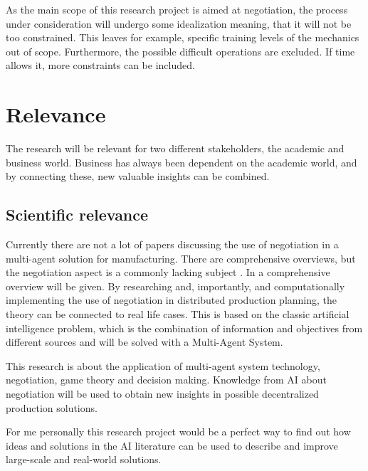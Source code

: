 As the main scope of this research project is aimed at negotiation, the process under consideration will undergo some idealization meaning, that it will not be too constrained. This leaves for example, specific training levels of the mechanics out of scope. Furthermore, the possible difficult operations are excluded.  If time allows it, more constraints can be included.

%

\section{Relevance}%
The research will be relevant for two different stakeholders, the academic and business world. Business has always been dependent on the academic world, and by connecting these, new valuable insights can be combined.
\subsection{Scientific relevance}
Currently there are not a lot of papers discussing the use of negotiation in a multi-agent solution for manufacturing. There are comprehensive overviews, but the negotiation aspect is a commonly lacking subject \citep{leitao2009agent}. In  a comprehensive overview will be given. By researching and, importantly, and computationally implementing the use of negotiation in distributed production planning, the theory can be connected to real life cases. This is based on the classic artificial intelligence problem, which is the combination of information and objectives from different sources and will be solved with a Multi-Agent System. 

This research is about the application of multi-agent system technology, negotiation, game theory and decision making. Knowledge from AI about negotiation will be used to obtain new insights in possible decentralized production solutions.  

For me personally this research project would be a perfect way to find out how ideas and solutions in the AI literature can be used to describe and improve large-scale and real-world solutions.
